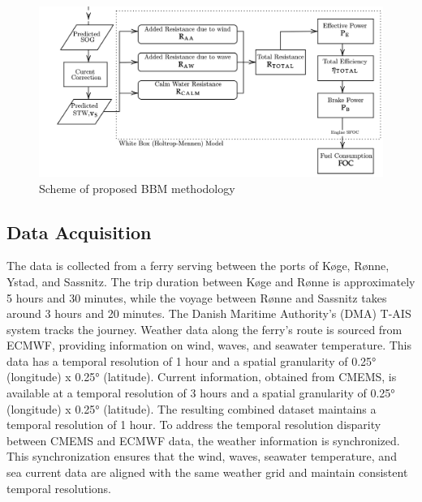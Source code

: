 \documentclass[]{interact}
\theoremstyle{plain}%
\theoremstyle{definition}
\theoremstyle{remark}
\begin{document}
\begin{figure}
  \centering
      \includegraphics[width=.75\textwidth]{00_figures/flowmethod_WBM.png}
      \caption{Scheme of proposed BBM methodology}
      \label{fig:flowchart_GBM}
\end{figure}

\subsection{Data Acquisition}\label{sec:data_acquisition}

The data is collected from a ferry serving between the ports of K{\o}ge, R{\o}nne, Ystad, and Sassnitz. The trip duration between K{\o}ge and R{\o}nne is approximately 5 hours and 30 minutes, while the voyage between Rønne and Sassnitz takes around 3 hours and 20 minutes. The Danish Maritime Authority's (DMA) T-AIS system tracks the journey. Weather data along the ferry's route is sourced from ECMWF, providing information on wind, waves, and seawater temperature. This data has a temporal resolution of 1 hour and a spatial granularity of 0.25° (longitude) x 0.25° (latitude). Current information, obtained from CMEMS, is available at a temporal resolution of 3 hours and a spatial granularity of 0.25° (longitude) x 0.25° (latitude). The resulting combined dataset maintains a temporal resolution of 1 hour. To address the temporal resolution disparity between CMEMS and ECMWF data, the weather information is synchronized. This synchronization ensures that the wind, waves, seawater temperature, and sea current data are aligned with the same weather grid and maintain consistent temporal resolutions.
\end{document}
